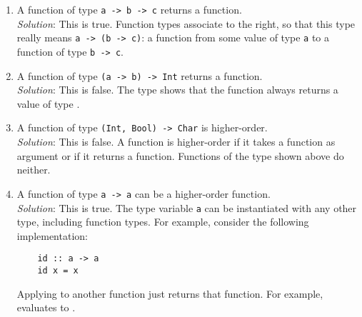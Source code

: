 \begin{enumerate}
	\item A function of type \texttt{\small a -> b -> c} returns a function. \\
	\emph{Solution}: This is true. Function types associate to the right, so that this type really means \texttt{\small a -> (b -> c)}: a function from some value of type \texttt{\small a} to a function of type \texttt{\small b -> c}.
	\item A function of type \texttt{\small (a -> b) -> Int} returns a function. \\
	\emph{Solution}: This is false. The type shows that the function always returns a value of type .
	\item A function of type \texttt{\small (Int, Bool) -> Char} is higher-order. \\
	\emph{Solution}: This is false. A function is higher-order if it takes a function as argument or if it returns a function. Functions of the type shown above do neither.
	\item A function of type \texttt{\small a -> a} can be a higher-order function.\\
	\emph{Solution}: This is true. The type variable \texttt{\small a} can be instantiated with any other type, including function types. For example, consider the following implementation:
	\begin{verbatim}
	id :: a -> a
	id x = x
	\end{verbatim}
	Applying  to another function just returns that function. For example,  evaluates to .
\end{enumerate}

\taskLine